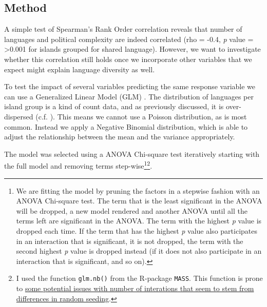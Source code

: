 \documentclass[a4paper,10pt]{article} %
\begin{document}

\subsection{Method}
\label{pol_complex_method}
A simple test of Spearman's Rank Order correlation reveals that number of languages and political complexity are indeed correlated (rho  = -0.4, \emph{p} value = >0.001 for islands grouped for shared language). However, we want to investigate whether this correlation still holds once we incorporate other variables that we expect might explain language diversity as well.

To test the impact of several variables predicting the same response variable we can use a Generalized Linear Model (GLM) \citep{venables2002modern}. The distribution of languages per island group is a kind of count data, and as previously discussed, it is over-dispersed (c.f. \citet[4-5]{gavin2012island}). This means we cannot use a Poisson distribution, as is most common. Instead we apply a Negative Binomial distribution, which is able to adjust the relationship between the mean and the variance appropriately. 

The model was selected using a ANOVA Chi-square test iteratively starting with the full model and removing terms step-wise\footnote{We are fitting the model by pruning the factors in a stepwise fashion with an ANOVA Chi-square test. The term that is the least significant in the ANOVA will be dropped, a new model rendered and another ANOVA until all the terms left are significant in the ANOVA. The term with the highest \emph{p} value is dropped each time. If the term that has the highest \emph{p} value also participates in an interaction that is significant, it is not dropped, the term with the second highest \emph{p} value is dropped instead (if it does not also participate in an interaction that is significant, and so on).}\footnote{I used the function \texttt{glm.nb()} from the R-package \texttt{MASS}. This function is prone to \href{https://stackoverflow.com/questions/11749977/why-does-glm-nb-throw-a-missing-value-error-only-on-very-specific-inputs}{some potential issues with number of interations that seem to stem from differences in random seeding}.}.
\end{document}
